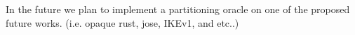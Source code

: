 In the future we plan to implement a partitioning oracle on one of the proposed future works. (i.e. opaque rust, jose, IKEv1, and etc..)
